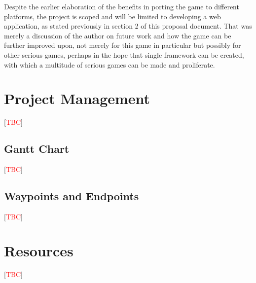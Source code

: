 \documentclass[a4paper]{article}
\newcommand{\comment}[1]{[\textcolor{red}{#1}]} %
\begin{document}
Despite the earlier elaboration of the benefits in porting the game to different platforms, the project is scoped and will be limited to developing a web application, as stated previously in section 2 of this proposal document. That was merely a discussion of the author on future work and how the game can be further improved upon, not merely for this game in particular but possibly for other serious games, perhaps in the hope that single framework can be created, with which a multitude of serious games can be made and proliferate.

\section{Project Management}
\comment{TBC}
\subsection{Gantt Chart}
\comment{TBC}
\subsection{Waypoints and Endpoints}
\comment{TBC}

\section{Resources}
\comment{TBC}

\printbibliography
\end{document}

